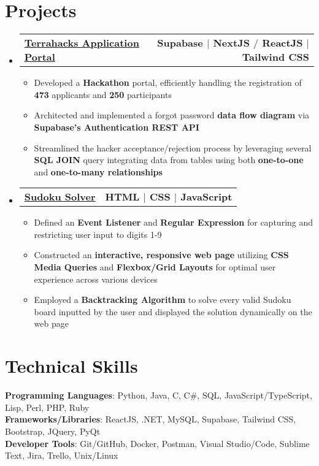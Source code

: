 \documentclass[letterpaper,11pt]{article}
\makeatletter
\newcommand{\resumeItem}[1]{
  \item\small{
    {#1 \vspace{-2pt}}
  }
}
\newcommand{\resumeProjectHeading}[2]{
    \item
    \begin{tabular*}{1.00\textwidth}{l@{\extracolsep{\fill}}r}
      \small#1 & #2 \\
    \end{tabular*}\vspace{-7pt}
    
}
\newcommand{\resumeSubHeadingListStart}{\begin{itemize}[leftmargin=0.0in, label={}]}
\newcommand{\resumeSubHeadingListEnd}{\end{itemize} \vspace{-18pt}}
\newcommand{\resumeItemListStart}{\begin{itemize}}
\newcommand{\resumeItemListEnd}{\end{itemize}\vspace{-4pt}}
\makeatother
\begin{document}
\section{Projects}
    \resumeSubHeadingListStart
      \resumeProjectHeading
        {
        \textbf{\href{https://terrahacks.ca/}
        {\color{blue}\underline{Terrahacks Application Portal}}}
        }{\textbf{Supabase $|$ NextJS $/$ ReactJS $|$ Tailwind CSS}}
        \resumeItemListStart
            \resumeItem{Developed a \textbf{Hackathon} portal, efficiently handling the registration of \textbf{473} applicants and \textbf{250} participants}
            \resumeItem{Architected and implemented a forgot password \textbf{data flow diagram} via \textbf{Supabase's  Authentication REST API}}
            \resumeItem{Streamlined the hacker acceptance/rejection process by leveraging several \textbf{SQL JOIN} query integrating data from tables using both \textbf{one-to-one} and  
            \textbf{one-to-many relationships}}
          \resumeItemListEnd
      \vspace{-7pt}
      \resumeProjectHeading
          {
          \textbf{\href{https://nicholas489.github.io/Sudoku_Solver/}{\color{blue}\underline{Sudoku Solver}}}
          }{\textbf{HTML $|$ CSS $|$ JavaScript}}
          \resumeItemListStart
            \resumeItem{Defined an \textbf{Event Listener} and \textbf{Regular Expression} for capturing and restricting user input to digits 1-9}
            \resumeItem{Constructed an \textbf{interactive, responsive web page} utilizing \textbf{CSS Media Queries} and \textbf{Flexbox/Grid Layouts} for optimal user experience across various devices}
            \resumeItem{Employed a \textbf{Backtracking Algorithm} to solve every valid Sudoku board inputted by the user and displayed the solution dynamically on the web page}
          \resumeItemListEnd
      \vspace{-3pt}
    \resumeSubHeadingListEnd
    
%
\section{Technical Skills}
 \begin{itemize}[leftmargin=0.0in, label={}]
    \small{\item{
     \textbf{Programming Languages}{: Python, Java, C, C\#, SQL, JavaScript/TypeScript, Lisp, Perl, PHP, Ruby} \\
     \textbf{Frameworks/Libraries}{: ReactJS, .NET, MySQL, Supabase, Tailwind CSS, Bootstrap, JQuery, PyQt} \\
     \textbf{Developer Tools}{: Git/GitHub, Docker, Postman, Visual Studio/Code, Sublime Text, Jira, Trello, Unix/Linux}
    }}
 \end{itemize}
\end{document}
